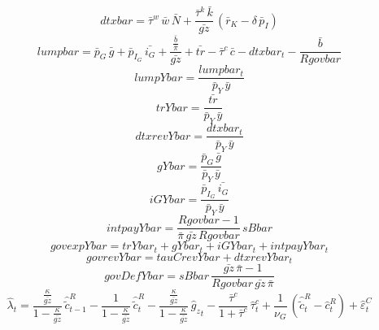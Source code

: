 \begin{dmath*}
dtxbar = {\bar{\tau}^w}\, {\bar{w}}\, {\bar{N}}+\frac{{\bar{\tau}^k}\, {\bar{k}}}{{\bar{gz}}}\, \left({\bar{r}_K}-{\delta}\, {\bar{p}_I}\right)
\end{dmath*}
\begin{dmath*}
lumpbar = {\bar{p}_G}\, {\bar{g}}+{\bar{p}_{I_G}}\, {\bar{i_G}}+\frac{\frac{{\bar{b}}}{{\bar{\pi}}}}{{\bar{gz}}}+{\bar{tr}}-{\bar{\tau}^c}\, {\bar{c}}-{dtxbar_{t}}-\frac{{\bar{b}}}{{Rgovbar}}
\end{dmath*}
\begin{dmath*}
lumpYbar = \frac{{lumpbar_{t}}}{{\bar{p}_Y}\, {\bar{y}}}
\end{dmath*}
\begin{dmath*}
trYbar = \frac{{\bar{tr}}}{{\bar{p}_Y}\, {\bar{y}}}
\end{dmath*}
\begin{dmath*}
dtxrevYbar = \frac{{dtxbar_{t}}}{{\bar{p}_Y}\, {\bar{y}}}
\end{dmath*}
\begin{dmath*}
gYbar = \frac{{\bar{p}_G}\, {\bar{g}}}{{\bar{p}_Y}\, {\bar{y}}}
\end{dmath*}
\begin{dmath*}
iGYbar = \frac{{\bar{p}_{I_G}}\, {\bar{i_G}}}{{\bar{p}_Y}\, {\bar{y}}}
\end{dmath*}
\begin{dmath*}
intpayYbar = \frac{{Rgovbar}-1}{{\bar{\pi}}\, {\bar{gz}}\, {Rgovbar}}\, {sBbar}
\end{dmath*}
\begin{dmath*}
govexpYbar = {trYbar_{t}}+{gYbar_{t}}+{iGYbar_{t}}+{intpayYbar_{t}}
\end{dmath*}
\begin{dmath*}
govrevYbar = {tauCrevYbar}+{dtxrevYbar_{t}}
\end{dmath*}
\begin{dmath*}
govDefYbar = {sBbar}\, \frac{{\bar{gz}}\, {\bar{\pi}}-1}{{Rgovbar}\, {\bar{gz}}\, {\bar{\pi}}}
\end{dmath*}
\begin{dmath}
{\hat{\lambda}_{t}}=\frac{\frac{{\kappa}}{{\bar{gz}}}}{1-\frac{{\kappa}}{{\bar{gz}}}}\, {\hat{\tilde{c}}^R_{t-1}}-\frac{1}{1-\frac{{\kappa}}{{\bar{gz}}}}\, {\hat{\tilde{c}}^R_{t}}-\frac{\frac{{\kappa}}{{\bar{gz}}}}{1-\frac{{\kappa}}{{\bar{gz}}}}\, {{\hat{g}_z}_{t}}-\frac{{\bar{\tau}^c}}{1+{\bar{\tau}^c}}\, {\hat{\tau}^c_{t}}+\frac{1}{{\nu_G}}\, \left({\hat{\tilde{c}}^R_{t}}-{\hat{c}^R_{t}}\right)+{\hat{\varepsilon}^C_{t}}
\end{dmath}
